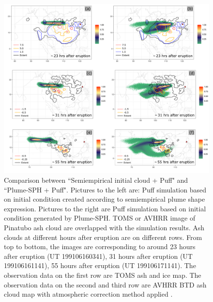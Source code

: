 \documentclass[utf8]{frontiersSCNS} %
\begin{document}
\begin{figure}[!htb]
\centering
\includegraphics[width=0.99 \textwidth]{Figures/bent_plume}
\caption{Comparison between ``Semiempirical initial cloud + Puff" and ``Plume-SPH + Puff". Pictures to the left are: Puff simulation based on initial condition created according to semiempirical plume shape expression. Pictures to the right are Puff simulation based on initial condition generated by Plume-SPH. TOMS or AVHRR image of Pinatubo ash cloud are overlapped with the simulation results. Ash clouds at different hours after eruption are on different rows. From top to bottom, the images are corresponding to around 23 hours after eruption (UT 199106160341), 31 hours after eruption (UT 199106161141), 55 hours after eruption (UT 199106171141). The observation data on the first row are TOMS ash and ice map. The observation data on the second and third row are AVHRR BTD ash cloud map with atmospheric correction method applied \citep{guo2004particles}.}
\label{fig:Plume-SPH-Puff-ash-cloud}
\end{figure}
\end{document}
